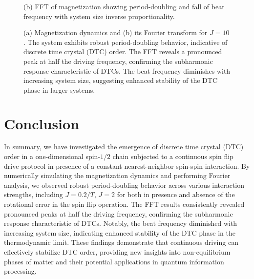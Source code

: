 \documentclass[a4paper, 11pt]{article}
\begin{document}
\begin{figure}[h!]
\begin{minipage}[t]{0.48\textwidth}
        \caption*{(b) FFT of magnetization showing period-doubling and fall of beat frequency with system size inverse proportionality.}
    \end{minipage}
    \caption{(a) Magnetization dynamics and (b) its Fourier transform for $J = 10$. The system exhibits robust period-doubling behavior, indicative of discrete time crystal (DTC) order. The FFT reveals a pronounced peak at half the driving frequency, confirming the subharmonic response characteristic of DTCs. The beat frequency diminishes with increasing system size, suggesting enhanced stability of the DTC phase in larger systems.}  
\end{figure}

\section{Conclusion}

In summary, we have investigated the emergence of discrete time crystal (DTC) order in a one-dimensional spin-$1/2$ chain subjected to a continuous spin flip drive protocol in presence of a constant nearest-neighbor spin-spin interaction. By numerically simulating the magnetization dynamics and performing Fourier analysis, we observed robust period-doubling behavior across various interaction strengths, including $J = 0.2/T$, $J = 2$ for both in presence and absence of the rotational error in the spin flip operation. The FFT results consistently revealed pronounced peaks at half the driving frequency, confirming the subharmonic response characteristic of DTCs. Notably, the beat frequency diminished with increasing system size, indicating enhanced stability of the DTC phase in the thermodynamic limit. These findings demonstrate that continuous driving can effectively stabilize DTC order, providing new insights into non-equilibrium phases of matter and their potential applications in quantum information processing.


\printbibliography
\end{document}
